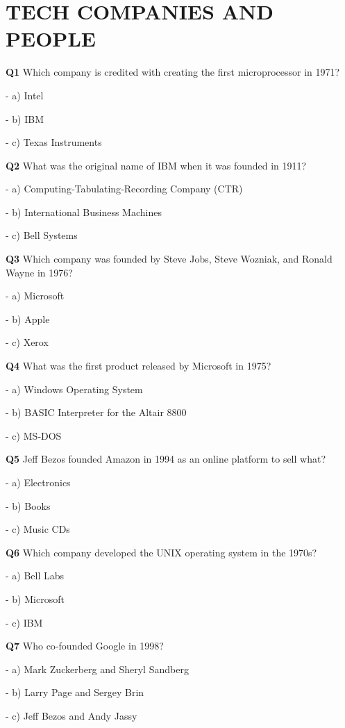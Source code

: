 \section{TECH COMPANIES AND PEOPLE}

\textbf{Q1} Which company is credited with creating the first microprocessor in 1971?\par
\quad - a) Intel\par
\quad - b) IBM\par
\quad - c) Texas Instruments\par

\textbf{Q2} What was the original name of IBM when it was founded in 1911?\par
\quad - a) Computing‑Tabulating‑Recording Company (CTR)\par
\quad - b) International Business Machines\par
\quad - c) Bell Systems\par

\textbf{Q3} Which company was founded by Steve Jobs, Steve Wozniak, and Ronald Wayne in 1976?\par
\quad - a) Microsoft\par
\quad - b) Apple\par
\quad - c) Xerox\par

\textbf{Q4} What was the first product released by Microsoft in 1975?\par
\quad - a) Windows Operating System\par
\quad - b) BASIC Interpreter for the Altair 8800\par
\quad - c) MS‑DOS\par

\textbf{Q5} Jeff Bezos founded Amazon in 1994 as an online platform to sell what?\par
\quad - a) Electronics\par
\quad - b) Books\par
\quad - c) Music CDs\par

\textbf{Q6} Which company developed the UNIX operating system in the 1970s?\par
\quad - a) Bell Labs\par
\quad - b) Microsoft\par
\quad - c) IBM\par

\textbf{Q7} Who co‑founded Google in 1998?\par
\quad - a) Mark Zuckerberg and Sheryl Sandberg\par
\quad - b) Larry Page and Sergey Brin\par
\quad - c) Jeff Bezos and Andy Jassy\par

